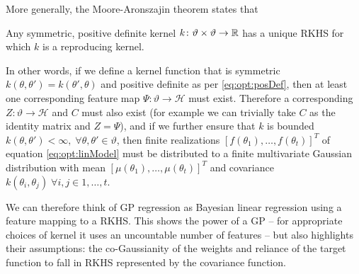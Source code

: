 More generally, the Moore-Aronszajin theorem \citep{aronszajn1950theory} states that
\begin{theorem}
	\label{the:opt:Moore-Aronszajin}
	Any symmetric, positive definite kernel $k \colon \vartheta \times \vartheta \rightarrow \mathbb{R}$ has a unique RKHS for which $k$ is a reproducing kernel.
\end{theorem}
\noindent In other words, if we define a kernel function that is symmetric $k\left(\theta,\theta'\right) = k\left(\theta',\theta\right)$ and positive definite as per \eqref{eq:opt:posDef}, then at least one corresponding feature map $\Psi \colon \vartheta \rightarrow \mathcal{H}$ must exist.  Therefore a corresponding $Z \colon \vartheta \rightarrow \mathcal{H}$ and $C$ must also exist (for example we can trivially take $C$ as the identity matrix and $Z = \Psi$), and if we further ensure that $k$ is bounded $k\left(\theta,\theta'\right) < \infty, \; \forall \theta, \theta' \in \vartheta$, then finite realizations  $\left[f\left(\theta_1\right),\dots,f\left(\theta_t\right)\right]^T$ of equation \eqref{eq:opt:linModel} must be distributed to a finite multivariate Gaussian distribution with mean  $\left[\mu\left(\theta_1\right),\dots,\mu\left(\theta_t\right)\right]^T$ and covariance $k\left(\theta_i,\theta_j\right) \; \forall i,j \in {1,\dots,t}$.  
%
%

We can therefore think of GP regression as Bayesian linear regression using
a feature mapping to a RKHS.  This shows the power of a GP -- for appropriate
choices of kernel it uses an uncountable number of features -- but also highlights
their assumptions: the co-Gaussianity of the weights and reliance of the target
function to fall in RKHS represented by the covariance function.